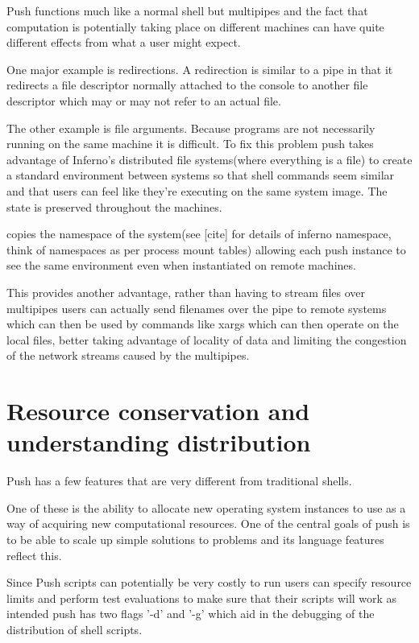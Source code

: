 \documentclass[11pt, letterpaper]{article}
\begin{document}
  


Push functions much like a normal shell but multipipes and the fact that computation is potentially taking place on different machines can have quite different effects from what a user might expect. 


One major example is redirections. A redirection is similar to a pipe in that it redirects a file descriptor normally attached to the console to another file descriptor which may or may not refer to an actual file. 


The other example is file arguments. Because programs are not necessarily running on the same machine it is difficult. To fix this problem push takes advantage of Inferno's distributed file systems(where everything is a file) to create a standard environment between systems so that shell commands seem similar and that users can feel like they're executing on the same system image. The state is preserved throughout the machines. 

copies the namespace of the system(see [cite] for details of inferno namespace, think of namespaces as per process mount tables) allowing each push instance to see the same environment even when instantiated on remote machines. 

This provides another advantage, rather than having to stream files over multipipes users can actually send filenames over the pipe to remote systems which can then be used by commands like xargs which can then operate on the local files, better taking advantage of locality of data and limiting the congestion of the network streams caused by the multipipes. 

\section{Resource conservation and understanding distribution}

 

Push has a few features that are very different from traditional shells. 

One of these is the ability to allocate new operating system instances to use as a way of acquiring new computational resources. One of the central goals of push is to be able to scale up simple solutions to problems and its language features reflect this. 

Since Push scripts can potentially be very costly to run users can specify resource limits and perform test evaluations to make sure that their scripts will work as intended push has two flags '-d' and '-g' which aid in the debugging of the distribution of shell scripts.
\end{document}
